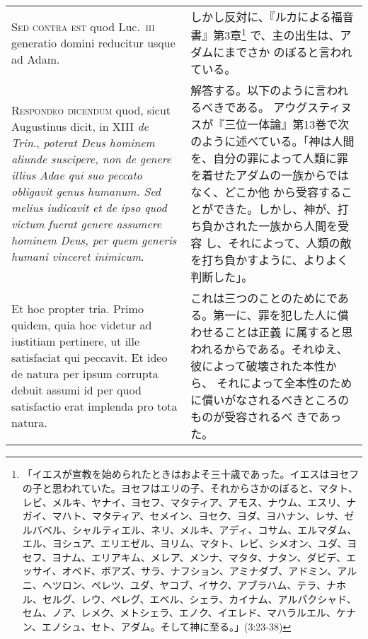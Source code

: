 \documentclass[10pt]{jsarticle} %
\begin{document}
\begin{longtable}{p{21em}p{21em}}
\\



{\scshape Sed contra est} quod Luc.~{\scshape iii} generatio domini reducitur usque ad Adam.


&


 しかし反対に、『ルカによる福音書』第3章\footnote{「イエスが宣教を始められたときはおよそ三十歳であった。イエスはヨセフの子と思われていた。ヨセフはエリの子、それからさかのぼると、マタト、レビ、メルキ、ヤナイ、ヨセフ、マタティア、アモス、ナウム、エスリ、ナガイ、マハト、マタティア、セメイン、ヨセク、ヨダ、ヨハナン、レサ、ゼルバベル、シャルティエル、ネリ、メルキ、アディ、コサム、エルマダム、エル、ヨシュア、エリエゼル、ヨリム、マタト、レビ、シメオン、ユダ、ヨセフ、ヨナム、エリアキム、メレア、メンナ、マタタ、ナタン、ダビデ、エッサイ、オベド、ボアズ、サラ、ナフション、アミナダブ、アドミン、アルニ、ヘツロン、ペレツ、ユダ、ヤコブ、イサク、アブラハム、テラ、ナホル、セルグ、レウ、ペレグ、エベル、シェラ、カイナム、アルパクシャド、セム、ノア、レメク、メトシェラ、エノク、イエレド、マハラルエル、ケナン、エノシュ、セト、アダム。そして神に至る。」(3:23-38)} で、主の出生は、アダムにまでさか
 のぼると言われている。


\\



{\scshape Respondeo dicendum} quod, sicut Augustinus dicit, in XIII {\itshape de Trin}.,
{\itshape poterat Deus hominem aliunde suscipere, non de genere illius Adae qui
suo peccato obligavit genus humanum. Sed melius iudicavit et de ipso
quod victum fuerat genere assumere hominem Deus, per quem generis humani
vinceret inimicum}. 

&

解答する。以下のように言われるべきである。
アウグスティヌスが『三位一体論』第13巻で次のように述べている。「神は人間
 を、自分の罪によって人類に罪を着せたアダムの一族からではなく、どこか他
 から受容することができた。しかし、神が、打ち負かされた一族から人間を受容
 し、それによって、人類の敵を打ち負かすように、よりよく判断した」。


\\

Et hoc propter tria. Primo quidem, quia hoc videtur
ad iustitiam pertinere, ut ille satisfaciat qui peccavit. Et ideo de
natura per ipsum corrupta debuit assumi id per quod satisfactio erat
implenda pro tota natura. 

&

これは三つのことのためにである。第一に、罪を犯した人に償わせることは正義
 に属すると思われるからである。それゆえ、彼によって破壊された本性から、
 それによって全本性のために償いがなされるべきところのものが受容されるべ
 きであった。



\end{longtable}
\end{document}
